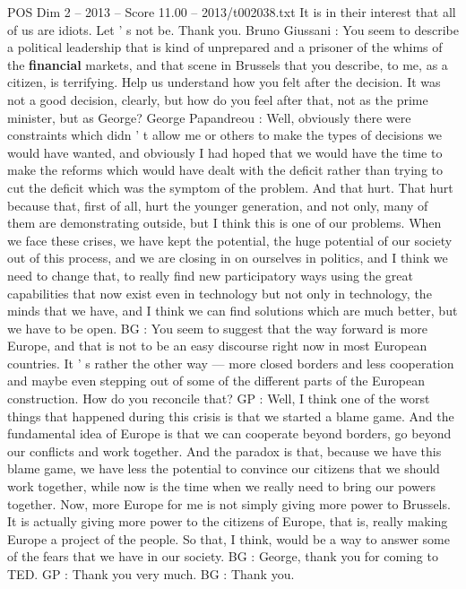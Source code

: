 \begin{textsample}{POS Dim 2 – 2013 – Score 11.00 – 2013/t002038.txt}
It is in their interest that all of us are idiots.
Let ' s not be.
Thank you.
Bruno Giussani : You seem to describe a political leadership that is kind of unprepared and a prisoner of the whims of the \textbf{financial} markets, and that scene in Brussels that you describe, to me, as a citizen, is terrifying.
Help us understand how you felt after the decision.
It was not a good decision, clearly, but how do you feel after that, not as the prime minister, but as George?
George Papandreou : Well, obviously there were constraints which didn ' t allow me or others to make the types of decisions we would have wanted, and obviously I had hoped that we would have the time to make the reforms which would have dealt with the deficit rather than trying to cut the deficit which was the symptom of the problem.
And that hurt.
That hurt because that, first of all, hurt the younger generation, and not only, many of them are demonstrating outside, but I think this is one of our problems.
When we face these crises, we have kept the potential, the huge potential of our society out of this process, and we are closing in on ourselves in politics, and I think we need to change that, to really find new participatory ways using the great capabilities that now exist even in technology but not only in technology, the minds that we have, and I think we can find solutions which are much better, but we have to be open.
BG : You seem to suggest that the way forward is more Europe, and that is not to be an easy discourse right now in most European countries.
It ' s rather the other way — more closed borders and less cooperation and maybe even stepping out of some of the different parts of the European construction.
How do you reconcile that?
GP : Well, I think one of the worst things that happened during this crisis is that we started a blame game.
And the fundamental idea of Europe is that we can cooperate beyond borders, go beyond our conflicts and work together.
And the paradox is that, because we have this blame game, we have less the potential to convince our citizens that we should work together, while now is the time when we really need to bring our powers together.
Now, more Europe for me is not simply giving more power to Brussels.
It is actually giving more power to the citizens of Europe, that is, really making Europe a project of the people.
So that, I think, would be a way to answer some of the fears that we have in our society.
BG : George, thank you for coming to TED.
GP : Thank you very much.
BG : Thank you.

\end{textsample}
